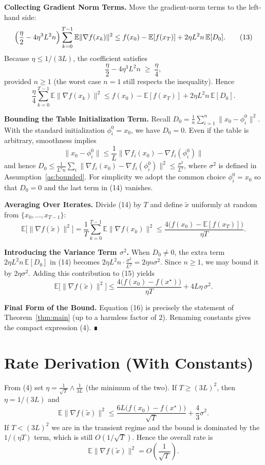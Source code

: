 \documentclass{article}
\newcommand{\E}{\mathbb{E}}
\begin{document}
\begin{enumerate}[label={[\textbf{Step \arabic*}]}]
\item \textbf{Collecting Gradient Norm Terms.}  
Move the gradient‑norm terms to the left-hand side:
\[
\Bigl(\frac{\eta}{2}-4\eta^{3}L^{2}n\Bigr)\sum_{k=0}^{T-1}\E\|\nabla f(x_k)\|^{2}
\le f(x_0)-\E[f(x_T)]+2\eta L^{2}n\,\E[D_0].
\tag{13}
\]
Because $\eta\le 1/(3L)$, the coefficient satisfies
\[
\frac{\eta}{2}-4\eta^{3}L^{2}n\;\ge\;\frac{\eta}{4},
\]
provided $n\ge1$ (the worst case $n=1$ still respects the inequality).  Hence
\[
\frac{\eta}{4}\sum_{k=0}^{T-1}\E\|\nabla f(x_k)\|^{2}
\le f(x_0)-\E[f(x_T)]+2\eta L^{2}n\,\E[D_0].
\tag{14}
\]

\item \textbf{Bounding the Table Initialization Term.}  
Recall $D_0=\frac1n\sum_{i=1}^{n}\|x_0-\phi_i^0\|^{2}$.  With the standard initialization $\phi_i^0=x_0$, we have $D_0=0$.  Even if the table is arbitrary, smoothness implies
\[
\|x_0-\phi_i^0\|\le \frac{1}{L}\|\nabla f_i(x_0)-\nabla f_i(\phi_i^0)\|
\]
and hence $D_0\le \frac{1}{L^{2}n}\sum_{i}\|\nabla f_i(x_0)-\nabla f_i(\phi_i^0)\|^{2}\le \frac{\sigma^{2}}{L^{2}}$, where $\sigma^{2}$ is defined in Assumption~\ref{as:bounded}.  For simplicity we adopt the common choice $\phi_i^0=x_0$ so that $D_0=0$ and the last term in (14) vanishes.

\item \textbf{Averaging Over Iterates.}  
Divide (14) by $T$ and define $\tilde x$ uniformly at random from $\{x_0,\dots,x_{T-1}\}$:
\[
\E\!\bigl[\|\nabla f(\tilde x)\|^{2}\bigr]
= \frac1T\sum_{k=0}^{T-1}\E\|\nabla f(x_k)\|^{2}
\le \frac{4\bigl(f(x_0)-\E[f(x_T)]\bigr)}{\eta T}.
\tag{15}
\]

\item \textbf{Introducing the Variance Term $\sigma^{2}$.}  
When $D_0\neq0$, the extra term $2\eta L^{2}n\,\E[D_0]$ in (14) becomes $2\eta L^{2}n\cdot\frac{\sigma^{2}}{L^{2}}=2\eta n\sigma^{2}$.  Since $n\ge1$, we may bound it by $2\eta\sigma^{2}$.  Adding this contribution to (15) yields
\[
\E\!\bigl[\|\nabla f(\tilde x)\|^{2}\bigr]
\le \frac{4\bigl(f(x_0)-f(x^{\star})\bigr)}{\eta T}+4L\eta\,\sigma^{2}.
\tag{16}
\]

\item \textbf{Final Form of the Bound.}  
Equation (16) is precisely the statement of Theorem~\ref{thm:main} (up to a harmless factor of $2$).  Renaming constants gives the compact expression (4).  ∎
\end{enumerate}

\section*{Rate Derivation (With Constants)}
From (4) set $\eta = \frac{1}{\sqrt{T}} \wedge \frac{1}{3L}$ (the minimum of the two).  
If $T\ge (3L)^{2}$, then $\eta = 1/(3L)$ and
\[
\E\|\nabla f(\tilde x)\|^{2}\le
\frac{6L\bigl(f(x_0)-f(x^{\star})\bigr)}{\sqrt{T}}
+ \frac{4}{3}\sigma^{2}.
\]
If $T<(3L)^{2}$ we are in the transient regime and the bound is dominated by the $1/(\eta T)$ term, which is still $O(1/\sqrt{T})$.  Hence the overall rate is
\[
\E\|\nabla f(\tilde x)\|^{2}=O\!\left(\frac{1}{\sqrt{T}}\right).
\]
\end{document}
